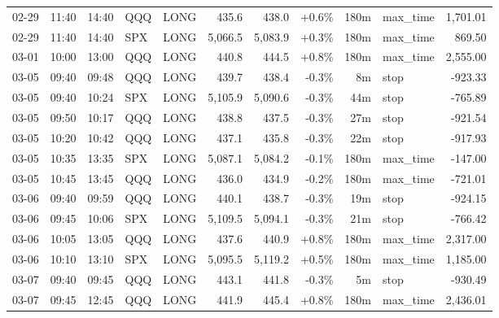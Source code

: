 \documentclass[11pt,a4paper,twoside]{article}
\begin{document}
\begin{center}
\begin{longtable}{>{\color{txtmain}}l l l l l r r r r >{\color{txtmain}}l r}
02-29 & 11:40 & 14:40 & QQQ & LONG & 435.6 & 438.0 & \textcolor{wingreen}{+0.6\%} & 180m & max\_time & \textcolor{wingreen}{1,701.01} \\
02-29 & 11:40 & 14:40 & SPX & LONG & 5,066.5 & 5,083.9 & \textcolor{wingreen}{+0.3\%} & 180m & max\_time & \textcolor{wingreen}{869.50} \\
03-01 & 10:00 & 13:00 & QQQ & LONG & 440.8 & 444.5 & \textcolor{wingreen}{+0.8\%} & 180m & max\_time & \textcolor{wingreen}{2,555.00} \\
03-05 & 09:40 & 09:48 & QQQ & LONG & 439.7 & 438.4 & \textcolor{lossred}{-0.3\%} & 8m & stop & \textcolor{lossred}{-923.33} \\
03-05 & 09:40 & 10:24 & SPX & LONG & 5,105.9 & 5,090.6 & \textcolor{lossred}{-0.3\%} & 44m & stop & \textcolor{lossred}{-765.89} \\
03-05 & 09:50 & 10:17 & QQQ & LONG & 438.8 & 437.5 & \textcolor{lossred}{-0.3\%} & 27m & stop & \textcolor{lossred}{-921.54} \\
03-05 & 10:20 & 10:42 & QQQ & LONG & 437.1 & 435.8 & \textcolor{lossred}{-0.3\%} & 22m & stop & \textcolor{lossred}{-917.93} \\
03-05 & 10:35 & 13:35 & SPX & LONG & 5,087.1 & 5,084.2 & \textcolor{lossred}{-0.1\%} & 180m & max\_time & \textcolor{lossred}{-147.00} \\
03-05 & 10:45 & 13:45 & QQQ & LONG & 436.0 & 434.9 & \textcolor{lossred}{-0.2\%} & 180m & max\_time & \textcolor{lossred}{-721.01} \\
03-06 & 09:40 & 09:59 & QQQ & LONG & 440.1 & 438.7 & \textcolor{lossred}{-0.3\%} & 19m & stop & \textcolor{lossred}{-924.15} \\
03-06 & 09:45 & 10:06 & SPX & LONG & 5,109.5 & 5,094.1 & \textcolor{lossred}{-0.3\%} & 21m & stop & \textcolor{lossred}{-766.42} \\
03-06 & 10:05 & 13:05 & QQQ & LONG & 437.6 & 440.9 & \textcolor{wingreen}{+0.8\%} & 180m & max\_time & \textcolor{wingreen}{2,317.00} \\
03-06 & 10:10 & 13:10 & SPX & LONG & 5,095.5 & 5,119.2 & \textcolor{wingreen}{+0.5\%} & 180m & max\_time & \textcolor{wingreen}{1,185.00} \\
03-07 & 09:40 & 09:45 & QQQ & LONG & 443.1 & 441.8 & \textcolor{lossred}{-0.3\%} & 5m & stop & \textcolor{lossred}{-930.49} \\
03-07 & 09:45 & 12:45 & QQQ & LONG & 441.9 & 445.4 & \textcolor{wingreen}{+0.8\%} & 180m & max\_time & \textcolor{wingreen}{2,436.01} \\

\end{longtable}
\end{center}
\end{document}
